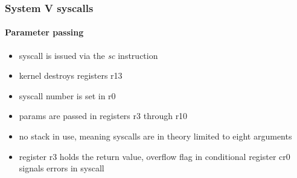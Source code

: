 \clearpage

\subsubsection{System V syscalls}

\paragraph{Parameter passing}

\begin{itemize}
\item syscall is issued via the {\em sc} instruction
\item kernel destroys registers r13
\item syscall number is set in r0
\item params are passed in registers r3 through r10
\item no stack in use, meaning syscalls are in theory limited to eight arguments
\item register r3 holds the return value, overflow flag in conditional register cr0 signals errors in syscall
\end{itemize}

